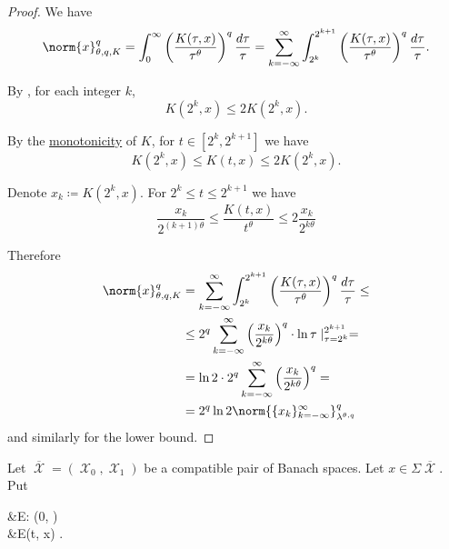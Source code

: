 \begin{proof}
  We have
  \begin{equation*}
    \norm{x}_{\theta,q,K}^q
    =
    \int_0^\infty \left( \frac {K(\tau, x)} {\tau^\theta} \right)^q \frac {d\tau} \tau
    =
    \sum_{k=-\infty}^\infty \int_{2^k}^{2^{k+1}} \left( \frac {K(\tau, x)} {\tau^\theta} \right)^q \frac {d\tau} \tau.
  \end{equation*}

  By , for each integer \( k \),
  \begin{equation*}
    K(2^k, x) \leq 2 K(2^k, x).
  \end{equation*}

  By the \hyperref[def:k_functional_properties/basic]{monotonicity} of \( K \), for \( t \in [2^k, 2^{k+1}] \) we have
  \begin{equation*}
    K(2^k, x) \leq K(t, x) \leq 2 K(2^k, x).
  \end{equation*}

  Denote \( x_k \coloneqq K(2^k, x) \). For \( 2^k \leq t \leq 2^{k+1} \) we have
  \begin{equation*}
    \frac{x_k}{2^{(k+1)\theta}} \leq \frac{K(t, x)}{t^\theta} \leq 2 \frac{x_k}{2^{k\theta}}
  \end{equation*}

  Therefore
  \begin{align*}
    \norm{x}_{\theta,q,K}^q
    &=
    \sum_{k=-\infty}^\infty \int_{2^k}^{2^{k+1}} \left( \frac {K(\tau, x)} {\tau^\theta} \right)^q \frac {d\tau} \tau
    \leq \\ &\leq
    2^q \sum_{k=-\infty}^\infty \left(\frac{x_k}{2^{k\theta}} \right)^q \cdot \ln \tau \mid_{\tau=2^k}^{2^{k+1}}
    = \\ &=
    \ln 2 \cdot 2^q \sum_{k=-\infty}^\infty \left(\frac{x_k}{2^{k\theta}} \right)^q
    = \\ &=
    2^q \ln 2 \norm{\{ x_k \}_{k=-\infty}^\infty}_{\lambda^{\theta,q}}^q
  \end{align*}
  and similarly for the lower bound.
\end{proof}

\begin{definition}\label{def:e_functional}
  Let \( \overline{\mscrX} = (\mscrX_0, \mscrX_1) \) be a compatible pair of Banach spaces. Let \( x \in \Sigma \overline{\mscrX} \). Put
  \begin{alignedeq}\label{eq:def:e_functional}
    &E: (0, \infty) \times {\Sigma \overline{\mscrX}} \\
    &E(t, x) \coloneqq \inf {}.
  \end{alignedeq}
\end{definition}

